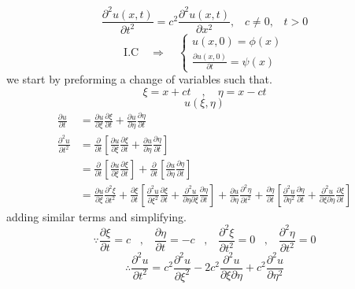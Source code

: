 \documentclass[]{article}
\begin{document}
\begin{equation}
\frac{\partial^2 u\left(x,t \right)}{\partial t^2} = c^2\frac{\partial^2 u\left(x,t \right)}{\partial x^2},\;\;\; c\neq 0,\;\;\; t>0
\end{equation}
\begin{equation}
    \text{I.C} \quad \Longrightarrow \quad 
    \begin{cases}
    u\left(x,0 \right) = \phi\left(x\right)
    \\
    \frac{\partial u\left(x,0 \right)}{\partial t} = \psi\left(x\right)
    \end{cases}
\end{equation}
we start by preforming a change of variables such that.
\[
    \xi = x+ct \quad , \quad \eta = x-ct    
\]
\[
    u\left(\xi , \eta \right)    
\]
\begin{align*}
\frac{\partial u}{\partial t} &= \frac{\partial u}{\partial \xi}\frac{\partial \xi}{\partial t} + \frac{\partial u}{\partial \eta} \frac{\partial \eta}{\partial t}
\\
\frac{\partial^2 u}{\partial t^2} &= \frac{\partial}{\partial t}\left[ \frac{\partial u}{\partial \xi}\frac{\partial \xi}{\partial t} + \frac{\partial u}{\partial \eta} \frac{\partial \eta}{\partial t}\right]
\\
&= \frac{\partial}{\partial t}\left[ \frac{\partial u}{\partial \xi}\frac{\partial \xi}{\partial t}\right] + \frac{\partial}{\partial t}\left[\frac{\partial u}{\partial \eta} \frac{\partial \eta}{\partial t}\right]
\\
&= \frac{\partial u}{\partial \xi}\frac{\partial^2 \xi}{\partial t^2} + \frac{\partial \xi}{\partial t}\left[\frac{\partial^2 u}{\partial \xi^2}\frac{\partial \xi}{\partial t} + \frac{\partial^2 u}{\partial\eta \partial\xi}\frac{\partial \eta}{\partial t} \right]+\frac{\partial u}{\partial \eta}\frac{\partial^2 \eta}{\partial t^2}+\frac{\partial \eta}{\partial t}\left[\frac{\partial^2 u}{\partial \eta^2}\frac{\partial \eta}{\partial t}+\frac{\partial^2 u}{\partial\xi\partial\eta}\frac{\partial\xi}{\partial t}\right]
\end{align*}
adding similar terms and simplifying.
\[
\because \frac{\partial\xi}{\partial t}=c\;\;\;,\;\;\;\frac{\partial\eta}{\partial t}=-c\;\;\;,\;\;\;\frac{\partial^2\xi}{\partial t^2}=0\;\;\;,\;\;\;\frac{\partial^2\eta}{\partial t^2}=0    
\]
\begin{equation}
\therefore \frac{\partial^2 u}{\partial t^2} = c^2\frac{\partial^2 u}{\partial\xi^2}-2c^2\frac{\partial^2 u}{\partial\xi\partial\eta}+c^2\frac{\partial^2 u}{\partial\eta^2}
\end{equation}
\end{document}

